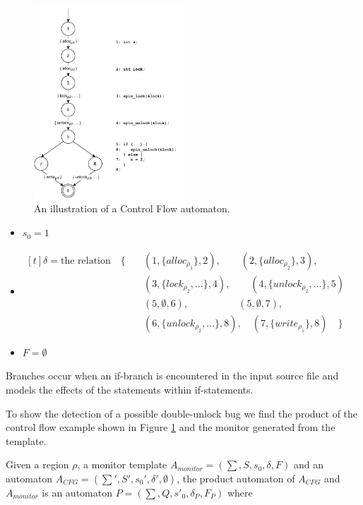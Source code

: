 \begin{figure}[t]
    \centering
    \includegraphics[width=0.5\textwidth]{algorithm/figures/cfg_example}
    \caption{An illustration of a Control Flow automaton.}
    \label{cfg_example-automaton}
\end{figure}

\begin{itemize}
    \item $s_0 = 1$ 
    \item {
        $
            \begin{aligned}[t]
            \delta = \text{the relation} \quad \{ \quad 
            & (1, \{alloc_{\rho_1}\}, 2), \quad \quad (2, \{alloc_{\rho_2}\}, 3), \\
            & (3, \{lock_{\rho_2}, ...\}, 4), \quad \quad (4, \{unlock_{\rho_2}, ...\}, 5) \\
            & (5, \emptyset, 6), \quad \quad \quad \quad \quad (5, \emptyset, 7), \\
            & (6, \{unlock_{\rho_2}, ...\}, 8), \quad (7, \{write_{\rho_1}\}, 8) \quad \}
            \end{aligned}
        $ 
    }
    \item $F = \emptyset$
\end{itemize}

\noindent Branches occur when an if-branch is encountered in the input source file and models the effects of the statements within if-statements.

\newpar To show the detection of a possible double-unlock bug we find the product of the control flow example shown in Figure \ref{cfg_example-automaton} and the monitor generated from the template. 

\newpar Given a region $\rho$, a monitor template $A_{monitor} = (\sum, S, s_0, \delta, F)$ and an automaton $A_{CFG} = (\sum', S', s_0', \delta', \emptyset)$, the product automaton of $A_{CFG}$ and $A_{monitor}$ is an automaton $P = (\sum, Q, s'_0, \delta_P, F_P)$ where 

